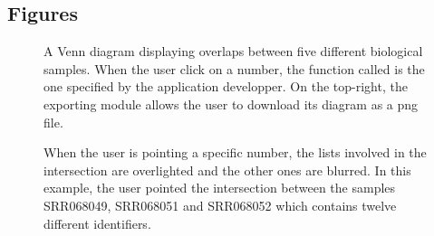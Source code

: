 \documentclass{bmcart}
\begin{document}
\begin{backmatter}


\section*{Figures}
  \begin{figure}[h!]
  \caption{
      A Venn diagram displaying overlaps between five different biological samples. When 
      the user click on a number, the function called is the one specified by the application
      developper. On the top-right, the exporting module allows the user to download its diagram
      as a png file.}
      \end{figure}

\begin{figure}[h!]
  \caption{
      When the user is pointing a specific number, the lists involved in the intersection
      are overlighted and the other ones are blurred. In this example, the user pointed the
      intersection between the samples SRR068049, SRR068051 and SRR068052 which contains
      twelve different identifiers.}
      \end{figure}

\end{backmatter}
\end{document}
